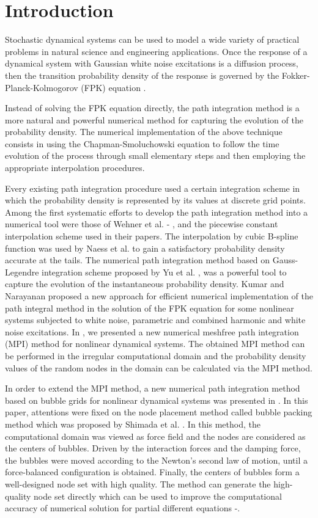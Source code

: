 \documentclass[a4paper, 11pt, final]{article}
\begin{document}
\section{Introduction}
Stochastic dynamical systems can be used to model a wide variety of
practical problems in natural science and engineering applications.
Once the response of a dynamical system with Gaussian white noise
excitations is a diffusion process, then the transition probability
density of the response is governed by the Fokker-Planck-Kolmogorov
(FPK) equation \cite{ZWQ2017,GCW1986}.

Instead of solving the FPK equation directly, the path integration
method is a more natural and powerful numerical method for capturing
the evolution of the probability density. The numerical implementation
of the above technique consists in using the Chapman-Smoluchowski
equation to follow the time evolution of the process through small
elementary steps and then employing the appropriate interpolation
procedures. 

Every existing path integration procedure used a certain integration
scheme in which the probability density is represented by its values
at discrete grid points. Among the first systematic efforts to develop
the path integration method into a numerical tool were those of Wehner
et al. \cite{1}-\cite{3} , and the piecewise constant interpolation scheme used in
their papers. The interpolation by cubic B-spline function was used by
Naess et al. \cite{4} to gain a satisfactory probability density accurate
at the tails. The numerical path integration method based on Gauss-Legendre
integration scheme proposed by Yu et al. \cite{5, 6}, was a powerful tool to
capture the evolution of the instantaneous probability density. Kumar
and Narayanan \cite{7, 8} proposed a new approach for efficient numerical
implementation of the path integral method in the solution of the FPK
equation for some nonlinear systems subjected to white noise, parametric
and combined harmonic and white noise excitations. In \cite{9}, we presented
a new numerical meshfree path integration (MPI) method for nonlinear
dynamical systems. The obtained MPI method can be performed in the
irregular computational domain and the probability density values
of the random nodes in the domain can be calculated via the MPI method.

In order to extend the MPI method, a new numerical path integration
method based on bubble grids for nonlinear dynamical systems was
presented in \cite{10}. In this paper, attentions were fixed on the node
placement method called bubble packing method which was proposed
by Shimada et al. \cite{11}. In this method, the computational domain
was viewed as force field and the nodes are considered as the centers of
bubbles. Driven by the interaction forces and the damping force, the bubbles
were moved according to the Newton’s second law of motion, until a
force-balanced configuration is obtained. Finally, the centers of
bubbles form a well-designed node set with high quality. The method
can generate the high-quality node set directly which can be used to
improve the computational accuracy of numerical solution for partial
different equations \cite{12}-\cite{17}.
\end{document}

